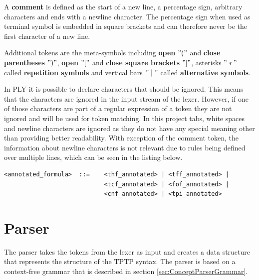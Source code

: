 A \textbf{comment} is defined as the start of a new line, a percentage sign, arbitrary characters and ends with a newline character.
The percentage sign when used as terminal symbol is embedded in square brackets and can therefore never be the first character of a new line.

Additional tokens are the meta-symbols including \textbf{open} $"("$ and \textbf{close parentheses} $")"$, \textbf{open} $"["$ and \textbf{close square brackets} $"]"$, asterisks $"*"$ called \textbf{repetition symbols} and vertical bars $"\mid"$ called \textbf{alternative symbols}.

In PLY it is possible to declare characters that should be ignored. This means that the characters are ignored in the input stream of the lexer. However, if one of those characters are part of a regular expression of a token they are not ignored and will be used for token matching. In this project tabs, white spaces and newline characters are ignored as they do not have any special meaning other than providing better readability. With exception of the comment token, the information about newline characters is not relevant due to rules being defined over multiple lines, which can be seen in the listing below.
\begin{lstlisting}[caption= Example of rules defined over multiple lines]
<annotated_formula>  ::=    <thf_annotated> | <tff_annotated> |
                            <tcf_annotated> | <fof_annotated> |
                            <cnf_annotated> | <tpi_annotated>
\end{lstlisting}

\section{Parser}\label{sec:ConceptParser}
The parser takes the tokens from the lexer as input and creates a data structure that represents the structure of the \ac{TPTP} syntax. The parser is based on a context-free grammar that is described in section \ref{sec:ConceptParserGrammar}.

